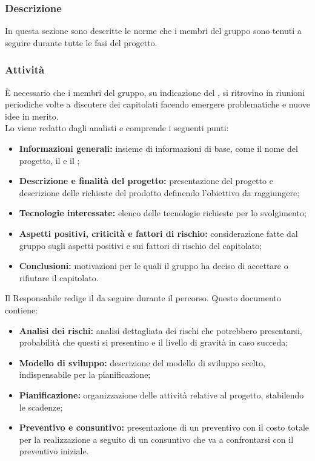 \subsubsection{Descrizione}
In questa sezione sono descritte le norme che i membri del gruppo \Omicron{} sono tenuti a seguire durante tutte le fasi del progetto.
\subsubsection{Attività}
\myparagraph{\SdF}
È necessario che i membri del gruppo, su indicazione del \respProg, si ritrovino in riunioni periodiche volte a discutere dei capitolati facendo emergere problematiche e nuove idee in merito.\\
Lo \SdFv{}viene redatto dagli analisti e comprende i seguenti punti:
\begin{itemize}
    \item \textbf{Informazioni generali:} insieme di informazioni di base, come il nome del progetto, il \proponProg{} e il \commitProg{};
    \item \textbf{Descrizione e finalità del progetto:} presentazione del progetto e descrizione delle richieste del prodotto definendo l'obiettivo da raggiungere;
    \item \textbf{Tecnologie interessate:} elenco delle tecnologie richieste per lo svolgimento;
    \item \textbf{Aspetti positivi, criticità e fattori di rischio:} considerazione fatte dal gruppo sugli aspetti positivi e sui fattori di rischio del capitolato;
    \item \textbf{Conclusioni:} motivazioni per le quali il gruppo ha deciso di accettare o rifiutare il capitolato.
\end{itemize}
\myparagraph{\PdP} 
Il Responsabile redige il \PdPv{}da seguire durante il percorso. Questo documento contiene:
\begin{itemize}
    \item \textbf{Analisi dei rischi:} analisi dettagliata dei rischi che potrebbero presentarsi, probabilità che questi si presentino e il livello di gravità in caso succeda;
    \item \textbf{Modello di sviluppo:} descrizione del modello di sviluppo scelto, indispensabile per la pianificazione;
    \item \textbf{Pianificazione:} organizzazione delle attività relative al progetto, stabilendo le scadenze;
    \item \textbf{Preventivo e consuntivo:} presentazione di un preventivo con il costo totale per la realizzazione a seguito di un consuntivo che va a confrontarsi con il preventivo iniziale.
\end{itemize}

